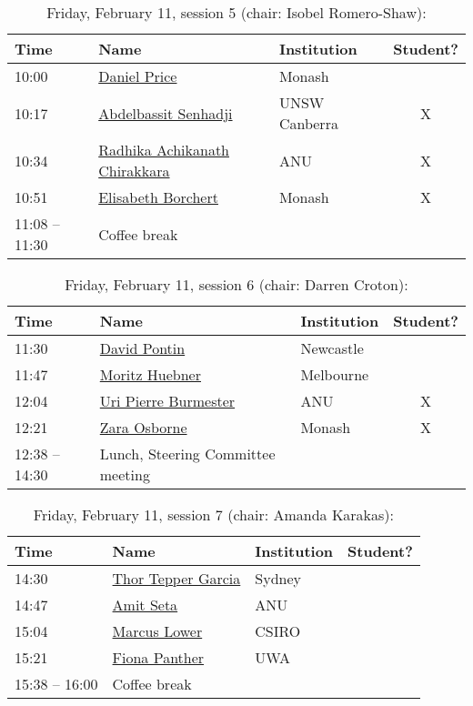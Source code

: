 \documentclass[amsmath,onecolumn]{revtex4-1}
\begin{document}
\begin{table}[!htbp]
	\centering
	\caption{Friday, February 11, session 5 (chair: Isobel Romero-Shaw):}
\begin{tabular}{| l | l | l | c |}
	\hline
	Time & Name  & Institution & Student? \\ 		
	\hline
	10:00 & \href{https://forms.gle/ZM8HoYqw1VRShzLNA}{Daniel Price} & Monash &  \\	
	10:17 & \href{https://forms.gle/ZM8HoYqw1VRShzLNA}{Abdelbassit	Senhadji} & UNSW Canberra & X \\
	10:34 & \href{https://forms.gle/ZM8HoYqw1VRShzLNA}{Radhika Achikanath Chirakkara} & ANU & X \\
	10:51 &\href{https://forms.gle/ZM8HoYqw1VRShzLNA}{Elisabeth Borchert} & Monash & X \\
	11:08 -- 11:30 & Coffee break & & \\
	\hline
\end{tabular}
\end{table}


\begin{table}[!htbp]
	\centering
	\caption{Friday, February 11, session 6 (chair: Darren Croton):}
\begin{tabular}{| l | l | l | c |}
	\hline
	Time & Name  & Institution & Student? \\ 		
	\hline
	11:30 & \href{https://forms.gle/ZM8HoYqw1VRShzLNA}{David	Pontin} & Newcastle &  \\
	11:47 & \href{https://forms.gle/ZM8HoYqw1VRShzLNA}{Moritz	Huebner} & Melbourne &  \\
	12:04 & \href{https://forms.gle/ZM8HoYqw1VRShzLNA}{Uri Pierre Burmester} &  ANU & X \\
	12:21 & \href{https://forms.gle/ZM8HoYqw1VRShzLNA}{Zara Osborne} & Monash & X \\
	12:38 -- 14:30 & Lunch, Steering Committee meeting & & \\
	\hline
\end{tabular}
\end{table}	

\begin{table}[!htbp]
	\centering
	\caption{Friday, February 11, session 7 (chair: Amanda Karakas):}
\begin{tabular}{| l | l | l | c |}
	\hline
	Time & Name  & Institution & Student? \\ 		
	\hline
	14:30 & \href{https://forms.gle/ZM8HoYqw1VRShzLNA}{Thor Tepper Garcia} & Sydney &  \\
	14:47 & \href{https://forms.gle/ZM8HoYqw1VRShzLNA}{Amit Seta} & ANU &  \\
	15:04 & \href{https://forms.gle/ZM8HoYqw1VRShzLNA}{Marcus Lower} & CSIRO & \\
	15:21 & \href{https://forms.gle/ZM8HoYqw1VRShzLNA}{Fiona	Panther} & UWA &  \\
	15:38 -- 16:00 & Coffee break & & \\
	\hline
\end{tabular}
\end{table}
\end{document}
